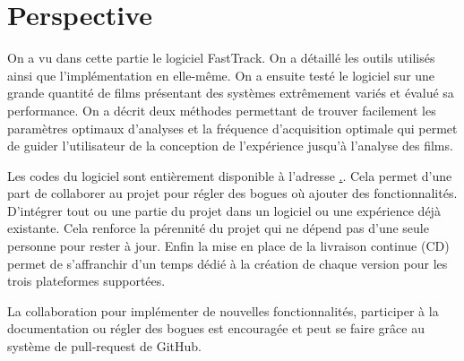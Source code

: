 \chapter{Perspective}

	On a vu dans cette partie le logiciel FastTrack. On a détaillé les outils utilisés ainsi que l'implémentation en elle-même. On a ensuite testé le logiciel sur une grande quantité de films présentant des systèmes extrêmement variés et évalué sa performance. On a décrit deux méthodes permettant de trouver facilement les paramètres optimaux d'analyses et la fréquence d'acquisition optimale qui permet de guider l'utilisateur de la conception de l'expérience jusqu'à l'analyse des films.
\medbreak
	
	Les codes du logiciel sont entièrement disponible à l'adresse \url{.}. Cela permet d'une part de collaborer au projet pour régler des bogues où ajouter des fonctionnalités. D'intégrer tout ou une partie du projet dans un logiciel ou une expérience déjà existante. Cela renforce la pérennité du projet qui ne dépend pas d'une seule personne pour rester à jour. Enfin la mise en place de la livraison continue (CD) permet de s'affranchir d'un temps dédié à la création de chaque version pour les trois plateformes supportées.
\medbreak
	
	La collaboration pour implémenter de nouvelles fonctionnalités, participer à la documentation ou régler des bogues est encouragée et peut se faire grâce au système de pull-request de GitHub.
	
	

